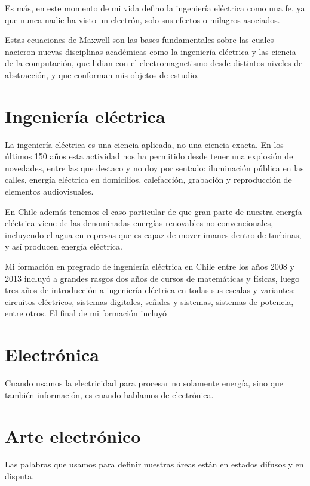 \documentclass{article}
\begin{document}
Es más, en este momento de mi vida defino la ingeniería eléctrica como una fe, ya que nunca nadie ha visto un electrón, solo sus efectos o milagros asociados.

Estas ecuaciones de Maxwell son las bases fundamentales sobre las cuales nacieron nuevas disciplinas académicas como la ingeniería eléctrica y las ciencia de la computación, que lidian con el electromagnetismo desde distintos niveles de abstracción, y que conforman mis objetos de estudio.

\section{Ingeniería eléctrica}

La ingeniería eléctrica es una ciencia aplicada, no una ciencia exacta. En los últimos 150 años esta actividad nos ha permitido desde tener una explosión de novedades, entre las que destaco y no doy por sentado: iluminación pública en las calles, energía eléctrica en domicilios, calefacción, grabación y reproducción de elementos audiovisuales.

En Chile además tenemos el caso particular de que gran parte de nuestra energía eléctrica viene de las denominadas energías renovables no convencionales, incluyendo el agua en represas que es capaz de mover imanes dentro de turbinas, y así producen energía eléctrica.

Mi formación en pregrado de ingeniería eléctrica en Chile entre los años 2008 y 2013 incluyó a grandes rasgos dos años de cursos de matemáticas y físicas, luego tres años de introducción a ingeniería eléctrica en todas sus escalas y variantes: circuitos eléctricos, sistemas digitales, señales y sistemas, sistemas de potencia, entre otros. El final de mi formación incluyó 



\section{Electrónica}

Cuando usamos la electricidad para procesar no solamente energía, sino que también información, es cuando hablamos de electrónica.


\section{Arte electrónico}

Las palabras que usamos para definir nuestras áreas están en estados difusos y en disputa.
\end{document}
